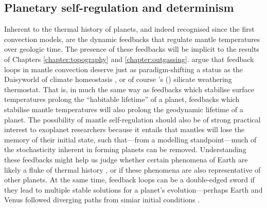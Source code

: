 \subsection{Planetary self-regulation and determinism}
\label{sec:background-feedbacks}

Inherent to the thermal history of planets, and indeed recognised since the first convection models, are the dynamic feedbacks that regulate mantle temperatures over geologic time. The presence of these feedbacks will be implicit to the results of Chapters \ref{chapter:topography} and \ref{chapter:outgassing}. %
\citet{lenardic_internal_2022} argue that feedback loops in mantle convection deserve just as paradigm-shifting a status as the Daisyworld of climate homeostasis \citep{lovelock_atmospheric_1974, watson_biological_1983}, or of course \citeauthor{walker_negative_1981}'s (\citeyear{walker_negative_1981}) silicate weathering thermostat. That is, in much the same way as feedbacks which stabilise surface temperatures prolong the ``habitable lifetime'' of a planet, feedbacks which stabilise mantle temperatures will also prolong the geodynamic lifetime of a planet. The possibility of mantle self-regulation should also be of strong practical interest to exoplanet researchers because it entails that mantles will lose the memory of their initial state, such that---from a modelling standpoint---much of the stochasticity inherent in forming planets can be removed. Understanding these feedbacks might help us judge whether certain phenomena of Earth are likely a fluke of thermal history \citep[e.g., the fact that the temperature near the top of the mantle is very close to the melting temperature of peridotite;][]{seales_buffering_2022}, or if these phenomena are also representative of other planets. At the same time, feedback loops can be a double-edged sword if they lead to multiple stable solutions for a planet's evolution---perhaps Earth and Venus followed diverging paths from simiar initial conditions \citep{lenardic_solar_2016}.

